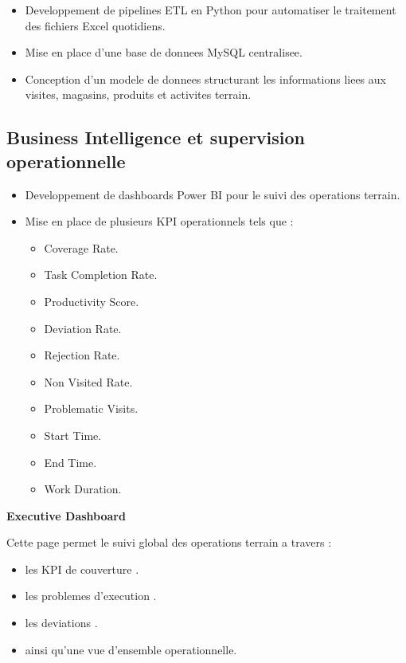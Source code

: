 \documentclass[12pt,a4paper]{article}
\begin{document}
\begin{itemize}
    \item Developpement de pipelines ETL en Python pour automatiser le traitement des fichiers Excel quotidiens.
    \item Mise en place d'une base de donnees MySQL centralisee.
    \item Conception d'un modele de donnees structurant les informations liees aux visites, magasins, produits et activites terrain.
\end{itemize}

\subsection*{Business Intelligence et supervision operationnelle}

\begin{itemize}
    \item Developpement de dashboards Power BI pour le suivi des operations terrain.
    \item Mise en place de plusieurs KPI operationnels tels que :
    \begin{itemize}
        \item Coverage Rate.
        \item Task Completion Rate.
        \item Productivity Score.
        \item Deviation Rate.
        \item Rejection Rate.
        \item Non Visited Rate.
        \item Problematic Visits.
        \item Start Time.
        \item End Time.
        \item Work Duration.
    \end{itemize}
\end{itemize}

\textbf{Executive Dashboard}

Cette page permet le suivi global des operations terrain a travers :

\begin{itemize}
    \item les KPI de couverture .
    \item les problemes d'execution .
    \item les deviations .
    \item ainsi qu'une vue d'ensemble operationnelle.
\end{itemize}
\end{document}
